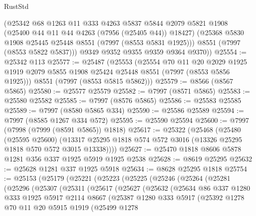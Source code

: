 \begin{lexlean}{RustStd}
\begin{coremodule}
        (@25342
          @68
          @1263
          @11
          @333
          @4263
          @5837
          @5844
          @2079
          @5821
          @1908
          (@25400 @44 @11 @44 @4263 (@7956 (@25405 @44)) @18427)
          (@25368 @5830 @1908 @25445 @25448 @8551 (@7997 (@8553 @5831 @1925)))
          @8551
          (@7997 (@8553 @5822 @5837)))
        @9349
        @9352
        @9355
        @9359
        @9364
        @9370))
@25554 := @25342 @113
@25577 := @25487
    (@25553
      (@25554
        @70
        @11
        @20
        @2029
        @1925
        @1919
        @2079
        @5855
        @1908
        @25424
        @25448
        @8551
        (@7997 (@8553 @5856 @1925)))
      @8551
      (@7997 (@8553 @5815 @5862)))
@25579 := @8566 (@8567 @5865)
@25580 := @25577 @25579
@25582 := @7997 (@8571 @5865)
@25583 := @25580 @25582
@25585 := @7997 (@8576 @5865)
@25586 := @25583 @25585
@25589 := @7997 (@8580 @5865 @334)
@25590 := @25586 @25589
@25594 := @7997 (@8585 @1267 @334 @572)
@25595 := @25590 @25594
@25600 := @7997 (@7998 (@7999 (@8591 @5865)) @1818)
@25617 := @25322
    (@25468
      (@25480
        (@25595 @25600)
        (@13317 @25295 @1818 @574 @572 @3016 (@13326 @25295 @1818 @570 @572 @3015 @13338))))
@25627 := @25470 @1818 @8606 @5878 @1281 @356 @337 @1925 @5919 @1925 @2538
@25628 := @8619 @25295
@25632 := @25628 @1281 @337 @1925 @5918
@25634 := @8628 @25295 @1818
@25754 := @25153
    (@25179
      (@25221
        (@25223
          (@25225
            (@25246
              (@25264
                (@25281
                  (@25296
                    (@25307
                      (@25311
                        (@25617
                          (@25627
                            (@25632
                              (@25634
                                @86
                                @337
                                @1280
                                @333
                                @1925
                                @5917
                                @2114
                                @8667
                                (@25387
                                  @1280
                                  @333
                                  @5917
                                  (@25392
                                    @1278
                                    @70
                                    @11
                                    @20
                                    @5915
                                    @1919
                                    (@25499
                                      @1278

\end{coremodule}
\end{lexlean}
